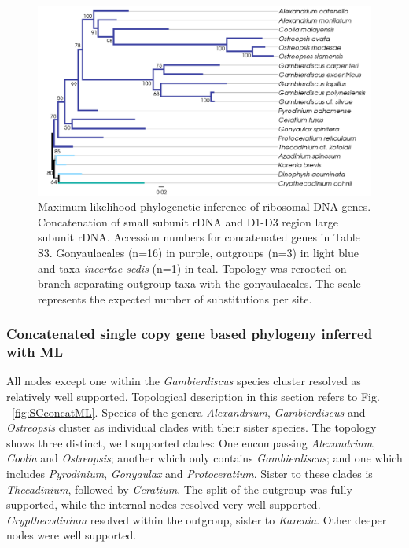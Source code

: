 \documentclass[12pt]{article}
\begin{document}
\begin{figure} 
\includegraphics[scale=.4]{figures/rDNA-ML.png} 
\caption{Maximum likelihood phylogenetic inference of ribosomal DNA genes. Concatenation of small subunit rDNA and D1-D3 region large subunit rDNA. Accession numbers for concatenated genes in Table S3. Gonyaulacales (n=16) in purple, outgroups (n=3) in light blue and taxa \textit{incertae sedis} (n=1) in teal. Topology was rerooted on branch separating outgroup taxa with the gonyaulacales. The scale represents the expected number of substitutions per site.} 
\label{fig:rdna}
\end{figure} 
\FloatBarrier

\subsubsection{Concatenated single copy gene based phylogeny inferred with ML}
\FloatBarrier
All nodes except one within the \emph{Gambierdiscus} species cluster resolved as relatively well supported. 
Topological description in this section refers to Fig. ~\ref{fig:SCconcatML}. 
Species of the genera \emph{Alexandrium}, \emph{Gambierdiscus} and \emph{Ostreopsis} cluster as individual clades with their sister species.  
The topology shows three distinct, well supported clades: 
One encompassing \emph{Alexandrium}, \emph{Coolia} and \emph{Ostreopsis}; another which only contains \emph{Gambierdiscus}; and one which includes \emph{Pyrodinium}, \emph{Gonyaulax} and \emph{Protoceratium}. 
Sister to these clades is \emph{Thecadinium}, followed by \emph{Ceratium}.
The split of the outgroup was fully supported, while the internal nodes resolved very well supported. 
\emph{Crypthecodinium} resolved within the outgroup, sister to \emph{Karenia}. 
Other deeper nodes were well supported.
 
\end{document}
